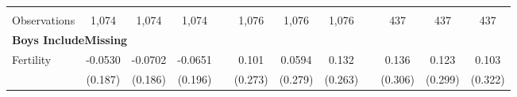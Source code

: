 \begin{landscape}
\begin{table}[htpb!]
\begin{center}
\begin{tabular}{lcccp{2mm}cccp{2mm}ccc}
\begin{footnotesize}\end{footnotesize}&\begin{footnotesize}\end{footnotesize}&\begin{footnotesize}\end{footnotesize}&\begin{footnotesize}\end{footnotesize}&\begin{footnotesize}\end{footnotesize}&\begin{footnotesize}\end{footnotesize}&\begin{footnotesize}\end{footnotesize}&\begin{footnotesize}\end{footnotesize}&\begin{footnotesize}\end{footnotesize}&\begin{footnotesize}\end{footnotesize}&\begin{footnotesize}\end{footnotesize}&\begin{footnotesize}\end{footnotesize}\\Observations&1,074&1,074&1,074&&1,076&1,076&1,076&&437&437&437\\
\multicolumn{12}{l}{\textbf{Boys IncludeMissing}}\\ 
Fertility&-0.0530&-0.0702&-0.0651&&0.101&0.0594&0.132&&0.136&0.123&0.103\\
&(0.187)&(0.186)&(0.196)&&(0.273)&(0.279)&(0.263)&&(0.306)&(0.299)&(0.322)\\

\end{tabular}
\end{center}
\end{table}
\end{landscape}
